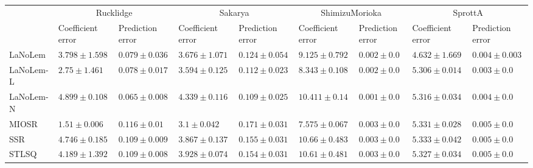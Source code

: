 \begin{table*}
{\begin{tabular}{lllllllll}
 & \multicolumn{2}{c}{Rucklidge} & \multicolumn{2}{c}{Sakarya} & \multicolumn{2}{c}{ShimizuMorioka} & \multicolumn{2}{c}{SprottA} \\
 & Coefficient error & Prediction error & Coefficient error & Prediction error & Coefficient error & Prediction error & Coefficient error & Prediction error \\
\midrule
LaNoLem & $3.798\pm 1.598$ & $0.079\pm 0.036$ & $3.676\pm 1.071$ & $0.124\pm 0.054$ & $9.125\pm 0.792$ & $0.002\pm 0.0$ & $\mathbf{4.632}\pm 1.669$ & $0.004\pm 0.003$ \\
LaNoLem-L & $2.75\pm 1.461$ & $0.078\pm 0.017$ & $3.594\pm 0.125$ & $0.112\pm 0.023$ & $8.343\pm 0.108$ & $0.002\pm 0.0$ & $5.306\pm 0.014$ & $\mathbf{0.003}\pm 0.0$ \\
LaNoLem-N & $4.899\pm 0.108$ & $\mathbf{0.065}\pm 0.008$ & $4.339\pm 0.116$ & $\mathbf{0.109}\pm 0.025$ & $10.411\pm 0.14$ & $\mathbf{0.001}\pm 0.0$ & $5.316\pm 0.034$ & $0.004\pm 0.0$ \\
MIOSR & $\mathbf{1.51}\pm 0.006$ & $0.116\pm 0.01$ & $\mathbf{3.1}\pm 0.042$ & $0.171\pm 0.031$ & $\mathbf{7.575}\pm 0.067$ & $0.003\pm 0.0$ & $5.331\pm 0.028$ & $0.005\pm 0.0$ \\
SSR & $4.746\pm 0.185$ & $0.109\pm 0.009$ & $3.867\pm 0.137$ & $0.155\pm 0.031$ & $10.66\pm 0.483$ & $0.003\pm 0.0$ & $5.333\pm 0.042$ & $0.005\pm 0.0$ \\
STLSQ & $4.189\pm 1.392$ & $0.109\pm 0.008$ & $3.928\pm 0.074$ & $0.154\pm 0.031$ & $10.61\pm 0.481$ & $0.003\pm 0.0$ & $5.327\pm 0.034$ & $0.005\pm 0.0$ \\

\midrule


\end{tabular}}
\end{table*}
